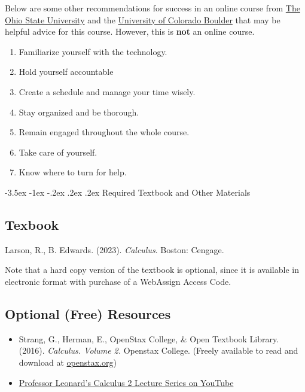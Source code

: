 \documentclass{article}
\makeatletter
\renewcommand\section{\@startsection{section}{1}{0pt}%
  {-3.5ex \@plus -1ex \@minus -.2ex}%
  {.2ex \@plus.2ex}%
  {\normalfont\Large\bfseries}} %
\makeatother
\begin{document}
Below are some other recommendations for success in an online course from \href{https://online.osu.edu/resources/learn/5-online-learning-tips-student-success}{The Ohio State University} and the \href{https://www.colorado.edu/health/tips-succeeding-online-classes}{University of Colorado Boulder} that may be helpful advice for this course. However, this is \textbf{not} an online course.

\begin{enumerate}
\item Familiarize yourself with the technology.
\item Hold yourself accountable
\item Create a schedule and manage your time wisely.
\item Stay organized and be thorough.
\item Remain engaged throughout the whole course.
\item Take care of yourself.
\item Know where to turn for help.
\end{enumerate}

\section{Required Textbook and Other Materials}

\subsection{Texbook}

Larson, R., B. Edwards. (2023). \textit{Calculus}. Boston: Cengage.

Note that a hard copy version of the textbook is optional, since it is available in electronic format with purchase of a WebAssign Access Code.

\subsection{Optional (Free) Resources}

\begin{itemize}
\item Strang, G., Herman, E., OpenStax College, \& Open Textbook Library. (2016). \textit{Calculus. Volume 2.} Openstax College. (Freely available to read and download at \href{https://openstax.org/details/books/calculus-volume-2}{openstax.org})


\item \href{https://www.youtube.com/watch?v=H9eCT6f\_Ftw\&list=PLDesaqWTN6EQ2J4vgsN1HyBeRADEh4Cw-\&index=1}{Professor Leonard's Calculus 2 Lecture Series on YouTube}
\end{itemize}
\end{document}
